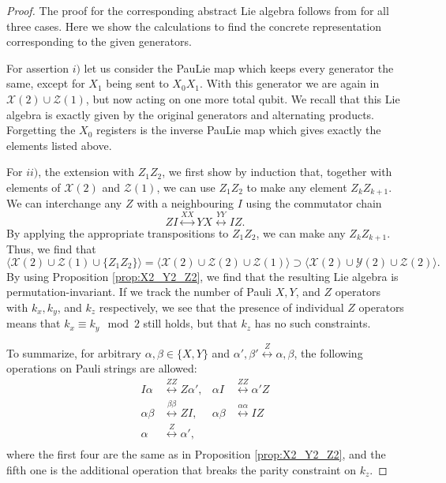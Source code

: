 \documentclass[12pt, a4-paper]{amsart}
\newcommand{\cX}{\mathcal{X}}
\newcommand{\cY}{\mathcal{Y}}
\newcommand{\cZ}{\mathcal{Z}}
\numberwithin{equation}{section}
\begin{document}
\begin{proof}
    The proof for the corresponding abstract Lie algebra follows from \cite{Aguilar2024FullClassificationLie} for all three cases. Here we show the calculations to find the concrete representation corresponding to the given generators.
    
    For assertion $i)$ let us consider the PauLie map which keeps every generator the same, except for $X_1$ being sent to $X_0X_1$. With this generator we are again in $\cX(2)\cup \cZ(1)$, but now acting on one more total qubit. We recall that this Lie algebra is exactly given by the original generators and alternating products. Forgetting the $X_0$ registers is the inverse PauLie map which gives exactly the elements listed above. 
    
    For $ii)$, the extension with $Z_1 Z_2$, we first show by induction that, together with elements of $\cX(2)$ and $\cZ(1)$, we can use $Z_1 Z_2$ to make any element $Z_k Z_{k+1}$. We can interchange any $Z$ with a neighbouring $I$ using the commutator chain
    \begin{equation}
        ZI \stackrel{XX}{\longleftrightarrow} YX \stackrel{YY}{\longleftrightarrow} IZ.
    \end{equation}
    By applying the appropriate transpositions to $Z_1 Z_2$, we can make any $Z_{k} Z_{k+1}$. Thus, we find that 
    \begin{equation}
         \langle \cX(2) \cup \cZ(1) \cup \{Z_1 Z_2\} \rangle = \langle \cX(2) \cup \cZ(2) \cup \cZ(1) \rangle \supset \langle \cX(2) \cup \cY(2) \cup \cZ(2) \rangle.
    \end{equation}
    By using Proposition \ref{prop:X2_Y2_Z2}, we find that the resulting Lie algebra is permutation-invariant. If we track the number of Pauli $X, Y$, and $Z$ operators with $k_x, k_y$, and $k_z$ respectively, we see that the presence of individual $Z$ operators means that $k_x \equiv k_y \mod{2}$ still holds, but that $k_z$ has no such constraints.

    To summarize, for arbitrary $\alpha, \beta \in \{X,Y\}$ and $\alpha', \beta' \stackrel{Z}{\longleftrightarrow} \alpha, \beta$, the following operations on Pauli strings are allowed:
    \begin{equation}
    \begin{aligned}
        I \alpha &\stackrel{ZZ}{\longleftrightarrow} Z \alpha', &  \alpha I & \stackrel{ZZ}{\longleftrightarrow} \alpha' Z \\
        \alpha \beta &\stackrel{\beta \beta}{\longleftrightarrow} ZI , & \alpha \beta &\stackrel{\alpha \alpha}{\longleftrightarrow} IZ \\
        \alpha &\stackrel{Z}{\leftrightarrow} \alpha', \\    
    \end{aligned}
    \end{equation}
    where the first four are the same as in Proposition \ref{prop:X2_Y2_Z2}, and the fifth one is the additional operation that breaks the parity constraint on $k_z$.


\end{proof}
\end{document}
